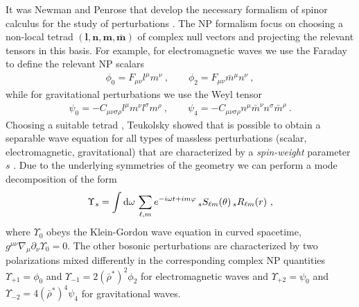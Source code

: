 It was Newman and Penrose that develop the necessary formalism of spinor calculus for the study of perturbations \cite{Newman1962}.
The NP formalism focus on choosing a non-local tetrad $(\bm{l},\bm{n},\bm{m},\bm{\bar{m}})$ of complex null vectors and projecting the relevant tensors in this basis.
For example, for electromagnetic waves we use the Faraday to define the relevant NP scalars
\begin{align}
    \phi_0 = F_{\mu\nu} l^\mu m^\nu ~,\qquad \phi_2 = F_{\mu\nu} \bar{m}^\mu n^\nu ~,
\end{align}
while for gravitational perturbations we use the Weyl tensor
\begin{align}
    \psi_0 = - C_{\mu\nu\sigma\rho} l^\mu m^\nu l^\sigma m^\rho ~,\qquad
    \psi_4 = - C_{\mu\nu\sigma\rho} n^\mu \bar{m}^\nu n^\sigma \bar{m}^\rho ~.
\end{align}
Choosing a suitable tetrad \cite{Kinnersley1969}, Teukolsky showed that is possible to obtain a separable wave equation for all types of massless perturbations (scalar, electromagnetic, gravitational) that are characterized by a \emph{spin-weight} parameter $s$ \cite{Teukolsky1972, Teukolsky1973a, TeukolskyPress1973b, Teukolsky1974}.
Due to the underlying symmetries of the geometry we can perform a mode decomposition of the form 
\begin{align}
    \Upsilon_s = \int \dd \omega \,\sum_{\ell, m} e^{ - i \omega t + i m \varphi } \uu[s]{S}{\ell m}(\theta) \uu[s]{R}{\ell m}(r) ~,
\end{align}
where $\Upsilon_0$ obeys the Klein-Gordon wave equation in curved spacetime, $g^{\mu\nu} \nabla_\mu \partial_\nu \Upsilon_0 = 0$.
The other bosonic perturbations are characterized by two polarizations mixed differently in the corresponding complex NP quantities $\Upsilon_{+1}=\phi_0$ and $\Upsilon_{-1}=2(\bar{\rho}^*)^2 \phi_2$ for electromagnetic waves and $\Upsilon_{+2}=\psi_0$ and $\Upsilon_{-2}=4(\bar{\rho}^*)^4 \psi_4$ for gravitational waves.





\clearpage